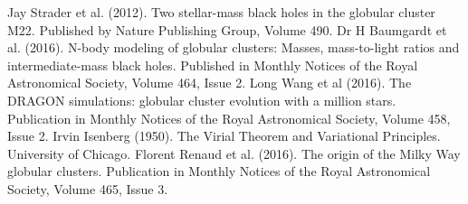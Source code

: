 



\begin{thebibliography}{}

 Jay Strader et al. (2012). Two stellar-mass black holes in the globular cluster M22. Published by Nature Publishing Group, Volume 490.
 Dr H Baumgardt et al. (2016). N-body modeling of globular clusters: Masses, mass-to-light ratios and intermediate-mass black holes. Published in Monthly Notices of the Royal Astronomical Society, Volume 464, Issue 2.
 Long Wang et al (2016). The DRAGON simulations: globular cluster evolution with a million stars. Publication in Monthly Notices of the Royal Astronomical Society, Volume 458, Issue 2.
 Irvin Isenberg (1950). The Virial Theorem and Variational Principles. University of Chicago.
 Florent Renaud et al. (2016). The origin of the Milky Way globular clusters. Publication in Monthly Notices of the Royal Astronomical Society, Volume 465, Issue 3.







\end{thebibliography} 
